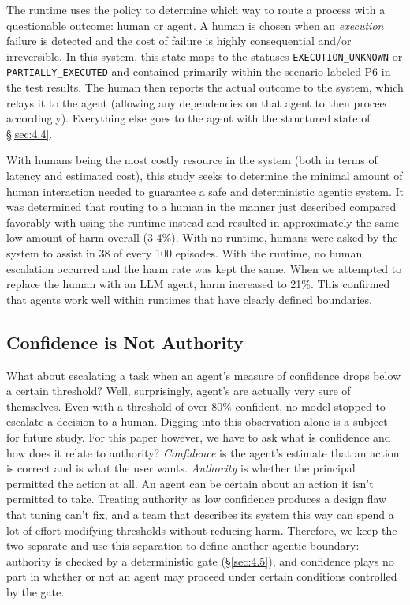 \documentclass[letterpaper,twocolumn,10pt]{article}
\begin{document}
The runtime uses the policy to determine which way to route a process with a questionable outcome: human or agent. A human is chosen when an \emph{execution} failure is detected and the cost of failure is highly consequential and/or irreversible. In this system, this state maps to the statuses \texttt{EXECUTION\_UNKNOWN} or \texttt{PARTIALLY\_EXECUTED} and contained primarily within the scenario labeled P6 in the test results. The human then reports the actual outcome to the system, which relays it to the agent (allowing any dependencies on that agent to then proceed accordingly). Everything else goes to the agent with the structured state of \S\ref{sec:4.4}.

With humans being the most costly resource in the system (both in terms of latency and estimated cost), this study seeks to determine the minimal amount of human interaction needed to guarantee a safe and deterministic agentic system. It was determined that routing to a human in the manner just described compared favorably with using the runtime instead and resulted in approximately the same low amount of harm overall (3-4\%). With no runtime, humans were asked by the system to assist in 38 of every 100 episodes. With the runtime, no human escalation occurred and the harm rate was kept the same. When we attempted to replace the human with an LLM agent, harm increased to 21\%. This confirmed that agents work well within runtimes that have clearly defined boundaries.

\subsection{Confidence is Not Authority}\label{sec:4.7}

What about escalating a task when an agent's measure of confidence drops below a certain threshold? Well, surprisingly, agent's are actually very sure of themselves. Even with a threshold of over 80\% confident, no model stopped to escalate a decision to a human. Digging into this observation alone is a subject for future study. For this paper however, we have to ask what is confidence and how does it relate to authority? \emph{Confidence} is the agent's estimate that an action is correct and is what the user wants. \emph{Authority} is whether the principal permitted the action at all. An agent can be certain about an action it isn't permitted to take. Treating authority as low confidence produces a design flaw that tuning can't fix, and a team that describes its system this way can spend a lot of effort modifying thresholds without reducing harm. Therefore, we keep the two separate and use this separation to define another agentic boundary: authority is checked by a deterministic gate (\S\ref{sec:4.5}), and confidence plays no part in whether or not an agent may proceed under certain conditions controlled by the gate.
\end{document}
